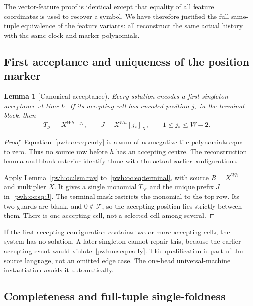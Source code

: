 \documentclass[11pt,letterpaper]{article}
\numberwithin{equation}{section}
\newtheorem{lemma}[theorem]{Lemma}
\theoremstyle{definition}
\newcommand{\F}{\mathcal F}
\newcommand{\rep}[1]{[#1]_X}
\newcommand{\TF}{T_{\F}}
\begin{document}
The vector-feature proof is identical except that equality of all feature
coordinates is used to recover a symbol. We have therefore justified the
full same-tuple equivalence of the feature variants: all reconstruct the
same actual history with the same clock and marker polynomials.

\subsection{First acceptance and uniqueness of the position marker}

\begin{lemma}[Canonical acceptance]
\label{pwh:oc:lem:acceptance}
Every solution encodes a first singleton acceptance at time $h$. If its
accepting cell has encoded position $j_*$ in the terminal block, then
\begin{equation}
 \TF=X^{Wh+j_*},\qquad
 J=X^{Wh}\rep{j_*},\qquad 1\le j_*\le W-2.
 \label{pwh:oc:eq:J}
\end{equation}
\end{lemma}

\begin{proof}
Equation~\eqref{pwh:oc:eq:early} is a sum of nonnegative tile polynomials equal
to zero. Thus no source row before $h$ has an accepting centre. The
reconstruction lemma and blank exterior identify these with the actual
earlier configurations.

Apply Lemma~\ref{pwh:oc:lem:ray} to~\eqref{pwh:oc:eq:terminal}, with source
$B=X^{Wh}$ and multiplier $X$. It gives a single monomial $\TF$ and
the unique prefix $J$ in~\eqref{pwh:oc:eq:J}. The terminal mask restricts the
monomial to the top row. Its two guards are blank, and $0\notin\F$,
so the accepting position lies strictly between them. There is one
accepting cell, not a selected cell among several.
\end{proof}

If the first accepting configuration contains two or more accepting
cells, the system has no solution. A later singleton cannot repair this,
because the earlier accepting event would violate~\eqref{pwh:oc:eq:early}.
This qualification is part of the source language, not an omitted edge
case. The one-head universal-machine instantiation avoids it automatically.

\subsection{Completeness and full-tuple single-foldness}
\end{document}
